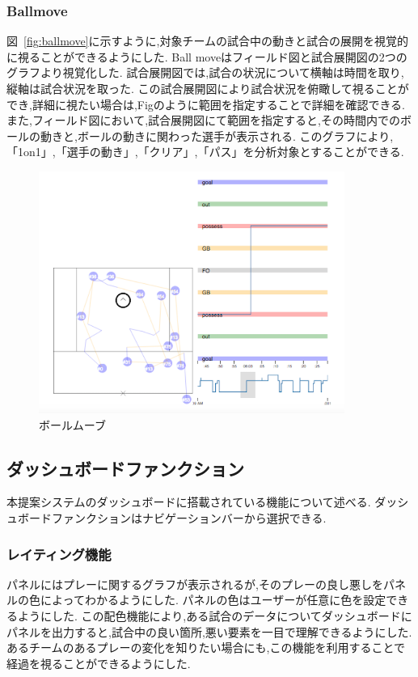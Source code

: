 \documentclass[sotsuron]{kuee}
\begin{document}
			\subsubsection{Ballmove}
				図~\ref{fig:ballmove}に示すように,対象チームの試合中の動きと試合の展開を視覚的に視ることができるようにした. 
				Ball moveはフィールド図と試合展開図の2つのグラフより視覚化した. 
				試合展開図では,試合の状況について横軸は時間を取り,縦軸は試合状況を取った. 
				この試合展開図により試合状況を俯瞰して視ることができ,詳細に視たい場合は,Figのように範囲を指定することで詳細を確認できる. 
				また,フィールド図において,試合展開図にて範囲を指定すると,その時間内でのボールの動きと,ボールの動きに関わった選手が表示される. 
				このグラフにより,「1on1」,「選手の動き」,「クリア」,「パス」を分析対象とすることができる. 
					\begin{figure}
						\begin{center}
							\includegraphics[width=10cm]{./png/ballmove.png}
						\end{center}
						\caption{ボールムーブ}
				  		\label{fig:basllmove}
					\end{figure}
		\subsection{ダッシュボードファンクション}
			本提案システムのダッシュボードに搭載されている機能について述べる. ダッシュボードファンクションはナビゲーションバーから選択できる. 
			\subsubsection{レイティング機能}
			パネルにはプレーに関するグラフが表示されるが,そのプレーの良し悪しをパネルの色によってわかるようにした. 
			パネルの色はユーザーが任意に色を設定できるようにした. 
			この配色機能により,ある試合のデータについてダッシュボードにパネルを出力すると,試合中の良い箇所,悪い要素を一目で理解できるようにした. 
			あるチームのあるプレーの変化を知りたい場合にも,この機能を利用することで経過を視ることができるようにした. 
\end{document}

